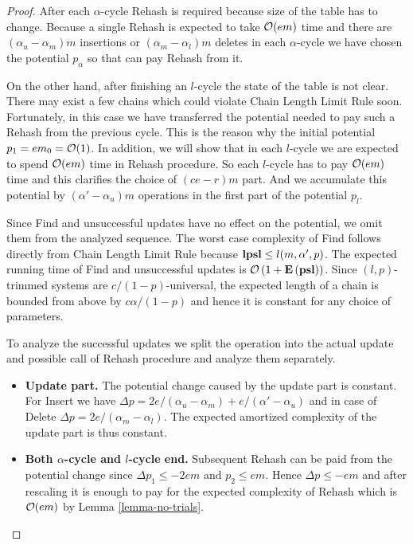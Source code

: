 \begin{proof}
After each $\alpha$-cycle Rehash is required because size of the table has to change.
Because a single Rehash is expected to take $\mathcal{O}(em)$ time and there are $(\alpha_u - \alpha_m)m$ insertions or $(\alpha_m - \alpha_l)m$ deletes in each $\alpha$-cycle we have chosen the potential $p_\alpha$ so that can pay Rehash from it.

On the other hand, after finishing an $l$-cycle the state of the table is not clear.
There may exist a few chains which could violate Chain Length Limit Rule soon.
Fortunately, in this case we have transferred the potential needed to pay such a Rehash from the previous cycle.
This is the reason why the initial potential $p_1 = em_0 = \mathcal{O}(1)$.
In addition, we will show that in each $l$-cycle we are expected to spend $\mathcal{O}(em)$ time in Rehash procedure.
So each $l$-cycle has to pay $\mathcal{O}(em)$ time and this clarifies the choice of $(ce - r)m$ part.
And we accumulate this potential by $(\alpha'-\alpha_u)m$ operations in the first part of the potential $p_l$.

Since Find and unsuccessful updates have no effect on the potential, we omit them from the analyzed sequence. 
The worst case complexity of Find follows directly from Chain Length Limit Rule because $\mathbf{lpsl} \leq l(m, \alpha', p)$.
The expected running time of Find and unsuccessful updates is $\mathcal{O}\left(1 + \mathbf{E}\left(\mathbf{psl}\right)\right)$.
Since $(l, p)$-trimmed systems are $c/(1 - p)$-universal, the expected length of a chain is bounded from above by $c\alpha/(1 - p)$ and hence it is constant for any choice of parameters.

To analyze the successful updates we split the operation into the actual update and possible call of Rehash procedure and analyze them separately.
\begin{itemize}
	\item \textbf{Update part.} 
The potential change caused by the update part is constant. 
For Insert we have $\Delta p = 2e/(\alpha_u - \alpha_m) + e/(\alpha' - \alpha_u)$ and in case of Delete $\Delta p = 2e/(\alpha_m - \alpha_l)$. 
The expected amortized complexity of the update part is thus constant. 

	\item \textbf{Both $\alpha$-cycle and $l$-cycle end.} 
Subsequent Rehash can be paid from the potential change since $\Delta p_1 \leq -2em$ and $p_2 \leq em$. 
Hence $\Delta p \leq -em$ and after rescaling it is enough to pay for the expected complexity of Rehash which is $\mathcal{O}(em)$ by Lemma \ref{lemma-no-trials}.


\end{itemize}
\end{proof}
